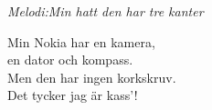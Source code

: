 {\footnotesize\textit{Melodi:Min hatt den har tre kanter }}\par
Min Nokia har en kamera,\\
en dator och kompass.\\
Men den har ingen korkskruv.\\
Det tycker jag är kass'!
\vspace{10pt}

